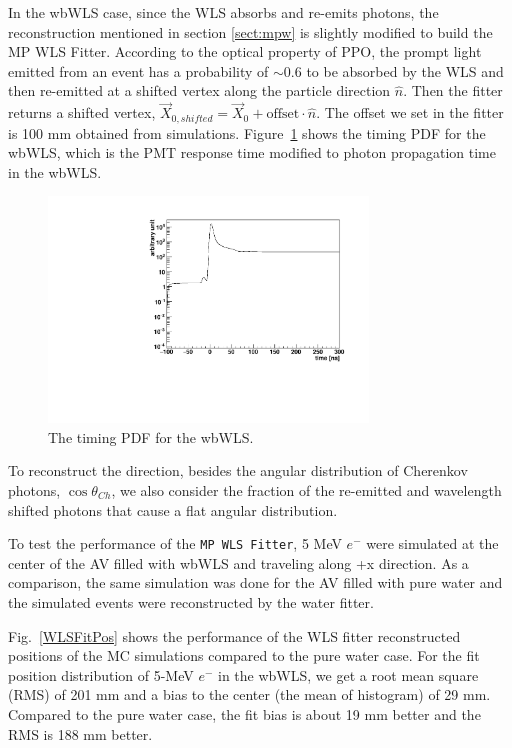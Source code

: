 In the wbWLS case, since the WLS absorbs and re-emits photons, the reconstruction mentioned in section \ref{sect:mpw} is slightly modified to build the MP WLS Fitter. According to the optical property of PPO, the prompt light emitted from an event has a probability of $\sim$0.6 to be absorbed by the WLS and then re-emitted at a shifted vertex along the particle direction $\hat{n}$. Then the fitter returns a shifted vertex, $\vec{X}_{0,shifted}=\vec{X}_0+\mathrm{offset}\cdot\hat{n}$. The offset we set in the fitter is 100 mm obtained from simulations. Figure~\ref{WLS_pdf} shows the timing PDF for the wbWLS, which is the PMT response time modified to photon propagation time in the wbWLS.
\begin{figure}[htbp]	
	\centering		
	\begin{minipage}[b]{0.5\textwidth}			
		\includegraphics[height=6cm]{WLSTime_pdf.pdf}			
	\end{minipage}%
	\caption{\label{WLS_pdf} The timing PDF for the wbWLS.}	
\end{figure}

To reconstruct the direction, besides the angular distribution of Cherenkov photons, $\cos\theta_{Ch}$, we also consider the fraction of the re-emitted and wavelength shifted photons that cause a flat angular distribution.

To test the performance of the \texttt{MP WLS Fitter}, 5 MeV $e^-$ were simulated at the center of the AV filled with wbWLS and traveling along +x direction. As a comparison, the same simulation was done for the AV filled with pure water and the simulated events were reconstructed by the water fitter.

Fig.~\ref{WLSFitPos} shows the performance of the WLS fitter reconstructed positions of the MC simulations compared to the pure water case. For the fit position distribution of 5-MeV $e^-$ in the wbWLS, we get a root mean square (RMS) of 201 mm and a bias to the center (the mean of histogram) of 29 mm. Compared to the pure water case, the fit bias is about 19 mm better and the RMS is 188 mm better.

